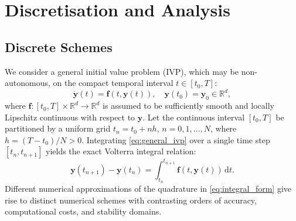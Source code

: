 \section{Discretisation and Analysis}

\subsection{Discrete Schemes}
\label{sec:discrete_schemes}

We consider a general initial value problem (IVP), which may be non-autonomous, on the compact temporal interval $t \in [t_0, T]$:
\begin{equation}
\label{eq:general_ivp}
\dot{\mathbf{y}}(t) = \mathbf{f}(t, \mathbf{y}(t)), \quad \mathbf{y}(t_0) = \mathbf{y}_0 \in \mathbb{R}^d,
\end{equation}
where $\mathbf{f}: [t_0, T] \times \mathbb{R}^d \to \mathbb{R}^d$ is assumed to be sufficiently smooth and locally Lipschitz continuous with respect to $\mathbf{y}$. Let the continuous interval $[t_0, T]$ be partitioned by a uniform grid
$t_n=t_0+nh$, $n=0,1,\ldots,N$, where $h=(T-t_0)/N>0$. Integrating \eqref{eq:general_ivp} over a single time step $[t_n,t_{n+1}]$ yields the exact Volterra integral relation:
\begin{equation}
\label{eq:integral_form}
\mathbf{y}(t_{n+1}) - \mathbf{y}(t_n) = \int_{t_n}^{t_{n+1}} \mathbf{f}(t, \mathbf{y}(t)) \, \mathrm{d}t.
\end{equation}
Different numerical approximations of the quadrature in \eqref{eq:integral_form} give rise to distinct numerical schemes with contrasting orders of accuracy, computational costs, and stability domains.

